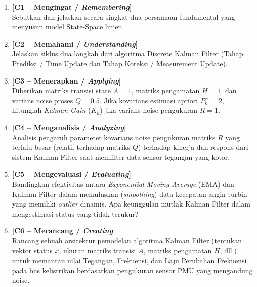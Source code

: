 \documentclass[11pt,a4paper]{article}
\begin{document}
\begin{enumerate}[leftmargin=1.8em, label=\textbf{Soal \arabic*.}]
    
    \item \textbf{[C1 -- Mengingat / \textit{Remembering}]} \\
    Sebutkan dan jelaskan secara singkat dua persamaan fundamental yang menyusun model State-Space linier.
    \vspace{2.2cm}

    \item \textbf{[C2 -- Memahami / \textit{Understanding}]} \\
    Jelaskan siklus dua langkah dari algoritma Discrete Kalman Filter (Tahap Prediksi / Time Update dan Tahap Koreksi / Measurement Update).
    \vspace{2.8cm}

    \item \textbf{[C3 -- Menerapkan / \textit{Applying}]} \\
    Diberikan matriks transisi state $A = 1$, matriks pengamatan $H = 1$, dan varians noise proses $Q = 0.5$. Jika kovarians estimasi apriori $P_k^- = 2$, hitunglah \textit{Kalman Gain} ($K_k$) jika varians noise pengukuran $R = 1$.
    \vspace{2.8cm}

    \newpage

    \item \textbf{[C4 -- Menganalisis / \textit{Analyzing}]} \\
    Analisis pengaruh parameter kovarians noise pengukuran matriks $R$ yang terlalu besar (relatif terhadap matriks $Q$) terhadap kinerja dan respons dari sistem Kalman Filter saat memfilter data sensor tegangan yang kotor.
    \vspace{3.5cm}

    \item \textbf{[C5 -- Mengevaluasi / \textit{Evaluating}]} \\
    Bandingkan efektivitas antara \textit{Exponential Moving Average} (EMA) dan Kalman Filter dalam memuluskan (\textit{smoothing}) data kecepatan angin turbin yang memiliki \textit{outlier} dinamis. Apa keunggulan mutlak Kalman Filter dalam mengestimasi status yang tidak terukur?
    \vspace{3.5cm}

    \item \textbf{[C6 -- Merancang / \textit{Creating}]} \\
    Rancang sebuah arsitektur pemodelan algoritma Kalman Filter (tentukan vektor status $x$, ukuran matriks transisi $A$, matriks pengamatan $H$, dll.) untuk memantau nilai Tegangan, Frekuensi, dan Laju Perubahan Frekuensi pada bus kelistrikan berdasarkan pengukuran sensor PMU yang mengandung noise.
    \vspace{4.5cm}

\end{enumerate}
\end{document}
